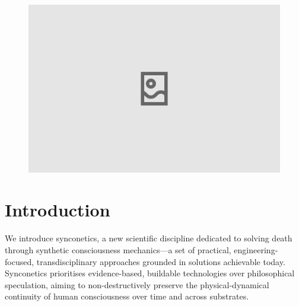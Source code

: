 \documentclass[10pt]{article}
\begin{document}
\begin{sloppypar}

  \begin{figure}[ht]
    \centering
    \includegraphics[width=\textwidth]{figures/cover.png}
    \label{fig:cover}
  \end{figure}
  \newpage



  \pagebreak
  \tableofcontents
  \pagebreak


  \section{Introduction}
  \label{sec:introduction}

  We introduce synconetics, a new scientific discipline dedicated to solving death through synthetic consciousness mechanics—a set of practical, engineering-focused, transdisciplinary approaches grounded in solutions achievable today. Synconetics prioritises evidence-based, buildable technologies over philosophical speculation, aiming to non-destructively preserve the physical-dynamical continuity of human consciousness over time and across substrates.


\end{sloppypar}
\end{document}
